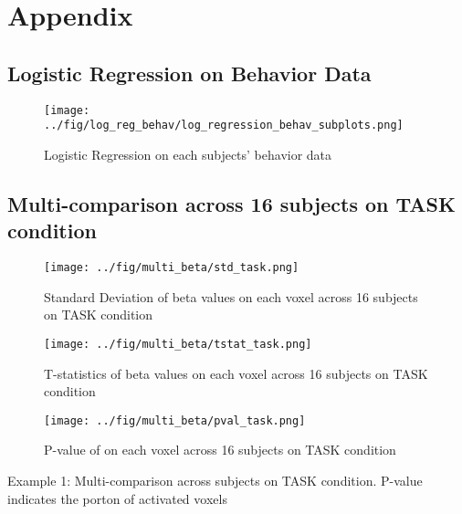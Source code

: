 \section {Appendix}
\subsection{Logistic Regression on Behavior Data}

\begin{figure}[H] 
\centering \texttt{[image: ../fig/log\_reg\_behav/log\_regression\_behav\_subplots.png]}	 
\caption{Logistic Regression on each subjects’ behavior data}
\end{figure} 

\subsection{Multi-comparison across 16 subjects on TASK condition}
\begin{figure}[H] 
\centering \texttt{[image: ../fig/multi\_beta/std\_task.png]}	 
\caption{Standard Deviation of beta values on each voxel across 16 subjects on TASK condition}
\end{figure} 

\begin{figure}[H] 
\centering \texttt{[image: ../fig/multi\_beta/tstat\_task.png]}	 
\caption{T-statistics of beta values on each voxel across 16 subjects on TASK condition}
\end{figure} 

\begin{figure}[H] 
\centering \texttt{[image: ../fig/multi\_beta/pval\_task.png]}	 
\caption{P-value of on each voxel across 16 subjects on TASK condition}
\end{figure} 

\begin{center}
Example 1: Multi-comparison across subjects on TASK condition. P-value indicates the porton of activated
voxels
\end{center}


